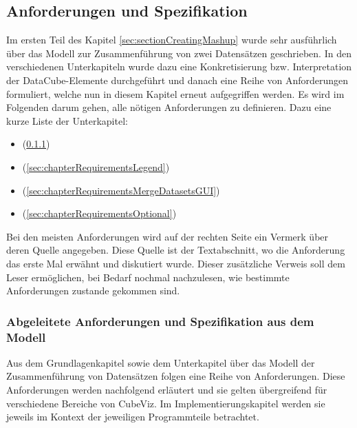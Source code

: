 \documentclass[11pt]{article}
\begin{document}
%
%
\subsection{Anforderungen und Spezifikation}
\label{sec:subsectionRequirementsAndSpecification}

Im ersten Teil des Kapitel \ref{sec:sectionCreatingMashup} wurde sehr ausführlich über das Modell zur Zusammenführung von zwei Datensätzen geschrieben. In den verschiedenen Unterkapiteln wurde dazu eine Konkretisierung bzw. Interpretation der DataCube-Elemente durchgeführt und danach eine Reihe von Anforderungen formuliert, welche nun in diesem Kapitel erneut aufgegriffen werden. Es wird im Folgenden darum gehen, alle nötigen Anforderungen zu definieren. Dazu eine kurze Liste der Unterkapitel:

\begin{itemize}
    
    \item {} (\ref{sec:chapterRequirementsModel})

    \item {} (\ref{sec:chapterRequirementsLegend})
    
    \item {} (\ref{sec:chapterRequirementsMergeDatasetsGUI})

    \item {} (\ref{sec:chapterRequirementsOptional})
    
\end{itemize}

\noindent
Bei den meisten Anforderungen wird auf der rechten Seite ein Vermerk über deren Quelle angegeben. Diese Quelle ist der Textabschnitt, wo die Anforderung das erste Mal erwähnt und diskutiert wurde. Dieser zusätzliche Verweis soll dem Leser ermöglichen, bei Bedarf nochmal nachzulesen, wie bestimmte Anforderungen zustande gekommen sind.


%
%
\subsubsection{Abgeleitete Anforderungen und Spezifikation aus dem Modell}
\label{sec:chapterRequirementsModel}

Aus dem Grundlagenkapitel sowie dem Unterkapitel über das Modell der Zusammenführung von Datensätzen folgen eine Reihe von Anforderungen. Diese Anforderungen werden nachfolgend erläutert und sie gelten übergreifend für verschiedene Bereiche von CubeViz. Im Implementierungskapitel werden sie jeweils im Kontext der jeweiligen Programmteile betrachtet.
\end{document}
